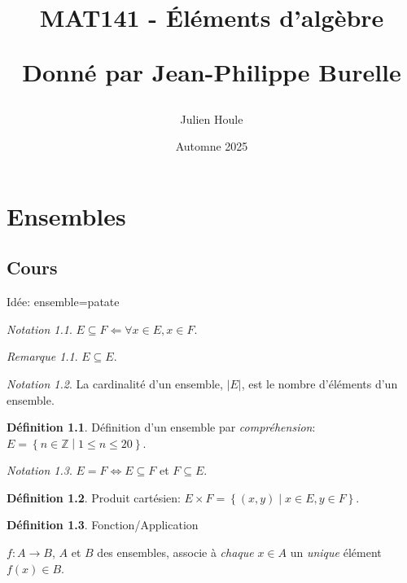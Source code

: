 \documentclass{report}
\title{MAT141 - \'El\'ements d'alg\`ebre

Donn\'e par Jean-Philippe Burelle}
\author{Julien Houle}
\date{Automne 2025}
\newcounter{cours}
\newcommand*{\cours}{\section*{Cours \thecours}\stepcounter{cours}}
\newcommand*{\card}[1]{\left| #1 \right|}
\newcommand*{\entiers}{\mathbb{Z}}
\theoremstyle{definition}
\newtheorem*{defin}{D\'efinition}
\theoremstyle{remark}
\newtheorem*{nota}{Notation}
\newtheorem*{rema}{Remarque}
\begin{document}
	\maketitle
	\tableofcontents
	\newpage

	\chapter{Ensembles}
	\cours
	Id\'ee: ensemble=patate


	\begin{nota}
		$E \subseteq F \Leftarrow \forall x \in E, x \in F$.
		\begin{rema}
			$E \subseteq E$.
		\end{rema}
	\end{nota}

	\begin{nota}
		La cardinalit\'e d'un ensemble, $\card{E}$, est le nombre d'\'el\'ements d'un ensemble.
	\end{nota}

	\begin{defin}
		D\'efinition d'un ensemble par \emph{compr\'ehension}: $E=\left\lbrace n \in \entiers \middle| 1 \leq n \leq 20 \right\rbrace$.
	\end{defin}

	\begin{nota}
		$E=F \Leftrightarrow E \subseteq F$ et $F \subseteq E$.
	\end{nota}

	\begin{defin}
		Produit cart\'esien: $E \times F=\left\lbrace (x,y) \middle| x \in E, y \in F \right\rbrace$.
	\end{defin}

	\begin{defin}
		Fonction/Application

		$f: A \to B$, $A$ et $B$ des ensembles, associe \`a \emph{chaque} $x \in A$ un \emph{unique} \'el\'ement $f(x) \in B$.
	\end{defin}
\end{document}
